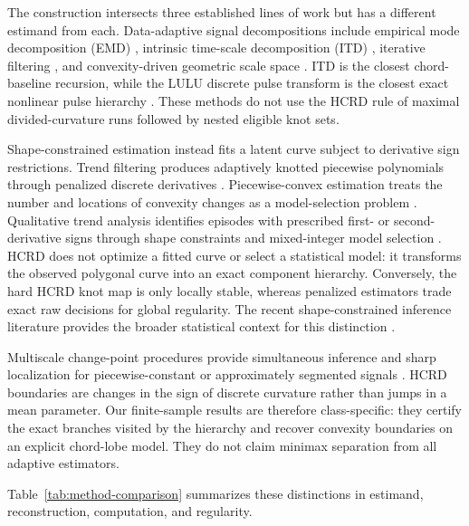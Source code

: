 \documentclass[review,onefignum,onetabnum]{siamonline250211}
\providecommand{\citep}[1]{\cite{#1}}
\begin{document}
The construction intersects three established lines of work but has a
different estimand from each.  Data-adaptive signal decompositions include
empirical mode decomposition (EMD) \citep{huang1998emd}, intrinsic time-scale
decomposition (ITD) \citep{frei2007itd}, iterative filtering
\citep{lin2009iterative}, and convexity-driven geometric scale space
\citep{chessel2009alpha}.  ITD is the closest chord-baseline recursion, while
the LULU discrete pulse transform is the closest exact nonlinear pulse
hierarchy \citep{anguelov2010lulu,laurie2011roadmaker}.  These methods do not
use the HCRD rule of maximal divided-curvature runs followed by nested eligible
knot sets.

Shape-constrained estimation instead fits a latent curve subject to derivative
sign restrictions.  Trend filtering produces adaptively knotted piecewise
polynomials through penalized discrete derivatives
\citep{kim2009trend,tibshirani2014trend}.  Piecewise-convex estimation treats
the number and locations of convexity changes as a model-selection problem
\citep{riedel2018piecewise}.  Qualitative trend analysis identifies episodes
with prescribed first- or second-derivative signs through shape constraints
and mixed-integer model selection \citep{chowdhury2023qualitative}.  HCRD does
not optimize a fitted curve or
select a statistical model: it transforms the observed polygonal curve into
an exact component hierarchy.  Conversely, the hard HCRD knot map is only
locally stable, whereas penalized estimators trade exact raw decisions for
global regularity.  The recent shape-constrained inference literature provides
the broader statistical context for this distinction
\citep{dumbgen2024shape}.

Multiscale change-point procedures provide simultaneous inference and sharp
localization for piecewise-constant or approximately segmented signals
\citep{frick2014multiscale,li2019multiscale}.  HCRD boundaries are changes in
the sign of discrete curvature rather than jumps in a mean parameter.  Our
finite-sample results are therefore class-specific: they certify the exact
branches visited by the hierarchy and recover convexity boundaries on an
explicit chord-lobe model.  They do not claim minimax separation from all
adaptive estimators.

Table~\ref{tab:method-comparison} summarizes these distinctions in estimand,
reconstruction, computation, and regularity.
\end{document}
